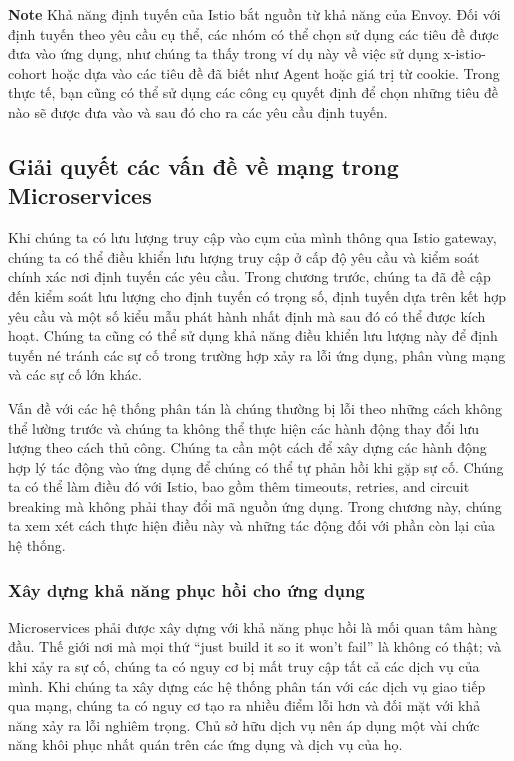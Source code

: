 \documentclass[12pt,a4paper]{report}
\begin{document}
\textbf{\color{blue}Note }Khả năng định tuyến của Istio bắt nguồn từ khả năng của Envoy. Đối với định tuyến theo yêu cầu cụ thể, các nhóm có thể chọn sử dụng các tiêu đề được đưa vào ứng dụng, như chúng ta thấy trong ví dụ này về việc sử dụng x-istio-cohort hoặc dựa vào các tiêu đề đã biết như Agent hoặc giá trị từ cookie. Trong thực tế, bạn cũng có thể sử dụng các công cụ quyết định để chọn những tiêu đề nào sẽ được đưa vào và sau đó cho ra các yêu cầu định tuyến.
		\subsection{Giải quyết các vấn đề về mạng trong Microservices}
\hspace{0.6cm}Khi chúng ta có lưu lượng truy cập vào cụm của mình thông qua Istio gateway, chúng ta có thể điều khiển lưu lượng truy cập ở cấp độ yêu cầu và kiểm soát chính xác nơi định tuyến các yêu cầu. Trong chương trước, chúng ta đã đề cập đến kiểm soát lưu lượng cho định tuyến có trọng số, định tuyến dựa trên kết hợp yêu cầu và một số kiểu mẫu phát hành nhất định mà sau đó có thể được kích hoạt. Chúng ta cũng có thể sử dụng khả năng điều khiển lưu lượng này để định tuyến né tránh các sự cố trong trường hợp xảy ra lỗi ứng dụng, phân vùng mạng và các sự cố lớn khác.

Vấn đề với các hệ thống phân tán là chúng thường bị lỗi theo những cách không thể lường trước và chúng ta không thể thực hiện các hành động thay đổi lưu lượng theo cách thủ công. Chúng ta cần một cách để xây dựng các hành động hợp lý tác động vào ứng dụng để chúng có thể tự phản hồi khi gặp sự cố. Chúng ta có thể làm điều đó với Istio, bao gồm thêm timeouts, retries, and circuit breaking mà không phải thay đổi mã nguồn ứng dụng. Trong chương này, chúng ta xem xét cách thực hiện điều này và những tác động đối với phần còn lại của hệ thống.
			\subsubsection{Xây dựng khả năng phục hồi cho ứng dụng}
\hspace{0.6cm}Microservices phải được xây dựng với khả năng phục hồi là mối quan tâm hàng đầu. Thế giới nơi mà mọi thứ “just build it so it won’t fail” là không có thật; và khi xảy ra sự cố, chúng ta có nguy cơ bị mất truy cập tất cả các dịch vụ của mình. Khi chúng ta xây dựng các hệ thống phân tán với các dịch vụ giao tiếp qua mạng, chúng ta có nguy cơ tạo ra nhiều điểm lỗi hơn và đối mặt với khả năng xảy ra lỗi nghiêm trọng. Chủ sở hữu dịch vụ nên áp dụng một vài chức năng khôi phục nhất quán trên các ứng dụng và dịch vụ của họ.
\end{document}
